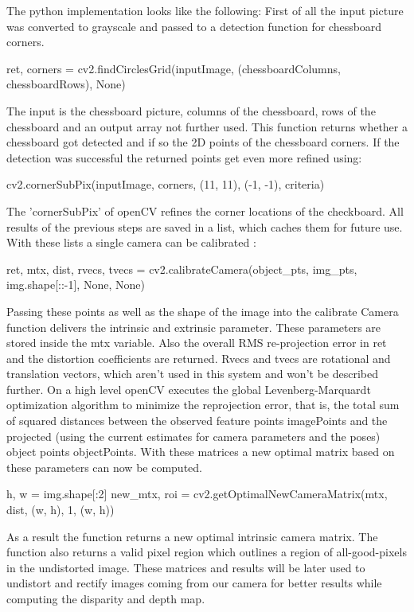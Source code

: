 \documentclass[journal,onecolumn]{IEEEtran}
\begin{document}
The python implementation looks like the following: \newline
First of all  the input picture was converted to grayscale and passed to a detection function for chessboard corners.
\begin{python}
ret, corners = cv2.findCirclesGrid(inputImage, (chessboardColumns, chessboardRows), None)
\end{python}
The input is the chessboard picture, columns of the chessboard, rows of the chessboard and an output array not further used.
This function returns whether a chessboard got detected and if so the 2D points of the chessboard corners. If the detection was successful the returned points get even more refined using:
\begin{python}
cv2.cornerSubPix(inputImage, corners, (11, 11), (-1, -1), criteria)
\end{python}
The 'cornerSubPix' of openCV refines the corner locations \cite{forstner} of the checkboard.
All results of the previous steps are saved in a list, which caches them for future use. With these lists a single camera can be calibrated :
\begin{python}
ret, mtx, dist, rvecs, tvecs = cv2.calibrateCamera(object_pts, img_pts, img.shape[::-1], None, 
											None)
\end{python}
Passing these points as well as the shape of the image into the calibrate Camera function delivers the intrinsic and extrinsic parameter.
These parameters are stored inside the mtx variable. Also the overall RMS re-projection error in ret and the distortion coefficients are returned. Rvecs\cite{DBLP} and tvecs are rotational and translation vectors, which aren't used in this system and won't be described further.
On a high level openCV executes the global Levenberg-Marquardt optimization algorithm to minimize the reprojection error, that is, the total sum of squared distances between the observed feature points imagePoints and the projected (using the current estimates for camera parameters and the poses) object points objectPoints\cite{calibrateCamera}.
With these matrices a new optimal matrix based on these parameters can now be computed.
\begin{python}
h, w = img.shape[:2]
new_mtx, roi = cv2.getOptimalNewCameraMatrix(mtx, dist, (w, h), 1, (w, h))
\end{python}
As a result the function returns a new optimal intrinsic camera matrix. The function also returns a valid pixel region which outlines a region of all-good-pixels in the undistorted image. These matrices and results will be later used to undistort and rectify images coming from our camera for better results while computing the disparity and depth map.
\end{document}
